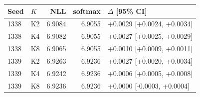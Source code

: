 \setlength{\tabcolsep}{3pt}\begin{tabular}{llrrl}
\toprule
Seed & $K$ & NLL & softmax & $\Delta$ [95\% CI] \\
\midrule
1338 & K2 & 6.9084 & 6.9055 & +0.0029 [+0.0024, +0.0034] \\
1338 & K4 & 6.9082 & 6.9055 & +0.0027 [+0.0025, +0.0029] \\
1338 & K8 & 6.9065 & 6.9055 & +0.0010 [+0.0009, +0.0011] \\
1339 & K2 & 6.9263 & 6.9236 & +0.0027 [+0.0020, +0.0034] \\
1339 & K4 & 6.9242 & 6.9236 & +0.0006 [+0.0005, +0.0008] \\
1339 & K8 & 6.9236 & 6.9236 & +0.0000 [-0.0003, +0.0004] \\
\bottomrule
\end{tabular}
